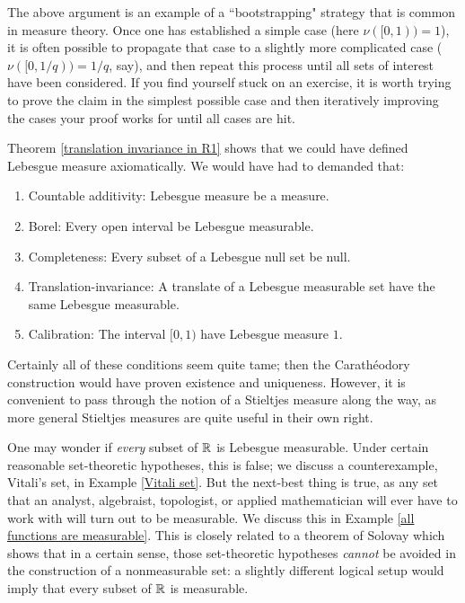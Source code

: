 \begin{subsec}
The above argument is an example of a ``bootstrapping" strategy that is common in measure theory.
Once one has established a simple case (here $\nu([0, 1)) = 1$), it is often possible to propagate that case to a slightly more complicated case ($\nu([0, 1/q)) = 1/q$, say), and then repeat this process until all sets of interest have been considered.
If you find yourself stuck on an exercise, it is worth trying to prove the claim in the simplest possible case and then iteratively improving the cases your proof works for until all cases are hit.
\end{subsec}

\begin{subsec}
Theorem \ref{translation invariance in R1} shows that we could have defined Lebesgue measure axiomatically. We would have had to demanded that:
\begin{enumerate}
\item Countable additivity: Lebesgue measure be a measure.
\item Borel: Every open interval be Lebesgue measurable.
\item Completeness: Every subset of a Lebesgue null set be null.
\item Translation-invariance: A translate of a Lebesgue measurable set have the same Lebesgue measurable.
\item Calibration: The interval $[0, 1)$ have Lebesgue measure $1$.
\end{enumerate}
Certainly all of these conditions seem quite tame; then the Carathéodory construction would have proven existence and uniqueness.
However, it is convenient to pass through the notion of a Stieltjes measure along the way, as more general Stieltjes measures are quite useful in their own right.
\end{subsec}

\begin{subsec}
One may wonder if \emph{every} subset of $\mathbb{R}$ is Lebesgue measurable.
Under certain reasonable set-theoretic hypotheses, this is false; we discuss a counterexample, Vitali's set, in Example \ref{Vitali set}.
But the next-best thing is true, as any set that an analyst, algebraist, topologist, or applied mathematician will ever have to work with will turn out to be measurable. We discuss this in Example \ref{all functions are measurable}.
This is closely related to a theorem of Solovay \cite{Solovay1970} which shows that in a certain sense, those set-theoretic hypotheses \emph{cannot} be avoided in the construction of a nonmeasurable set: a slightly different logical setup would imply that every subset of $\mathbb{R}$ is measurable.
\end{subsec}

